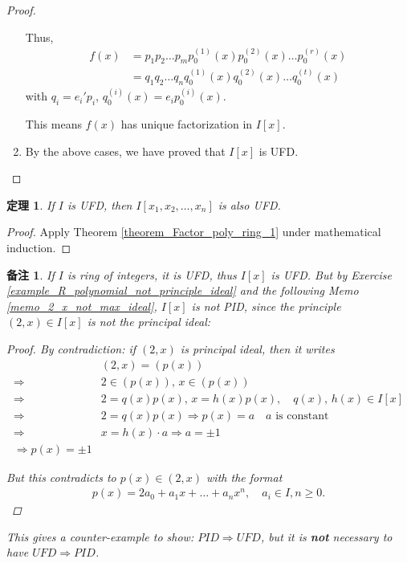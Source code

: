 \documentclass[utf8]{ctexbook}
\newtheorem{theorem}{定理}[section]
\newtheorem{memo}{备注}[section]
\begin{document}
\begin{proof}
\begin{enumerate}
{\begin{itemize}
{Thus,
\begin{align*}
f(x) &= p_1 p_2 \ldots p_m p_0 ^{(1)} (x) p_0 ^{(2)} (x) \ldots p_0 ^{(r)} (x)  \\
&= q_1 q_2 \ldots q_n q_0 ^{(1)} (x) q_0 ^{(2)} (x) \ldots q_0 ^{(t)} (x) 
\end{align*}
with $q_i = e_i ' p_i $, $q_0 ^{(i)} (x) = e_i p_0 ^{(i)} (x)$.

This means $f(x)$ has unique factorization in $I[x]$. 
}
\end{itemize}
}
\item{By the above cases, we have proved that $I[x]$ is UFD.}
\end{enumerate}
\end{proof}


\begin{theorem}
\label{theorem_Factor_poly_ring_2}
If $I$ is UFD, then $I[x_1, x_2, \ldots, x_n]$ is also UFD.
\end{theorem}

\begin{proof}
Apply Theorem \ref{theorem_Factor_poly_ring_1} under mathematical induction.
\end{proof}


\begin{memo}
If $I$ is ring of integers, it is UFD, thus $I[x]$ is UFD. But by Exercise \ref{example_R_polynomial_not_principle_ideal} and the following Memo \ref{memo_2_x_not_max_ideal}, $I[x]$ is not PID, since the principle $(2, x) \in I[x]$ is not the principal ideal: 

\begin{proof}

By contradiction: if $(2,x)$ is principal ideal, then it writes
\begin{align*}
& (2,x) = (p(x)) \\
\Longrightarrow & 2 \in (p(x)), \, x \in (p(x)) \\
\Longrightarrow & 2 = q(x) p(x), \, x = h(x) p(x), \quad q(x), \, h(x) \in I[x] \\
\Longrightarrow & 2 = q(x) p(x) \Longrightarrow p(x) = a \quad a \mbox{ is constant} \\
\Longrightarrow & x = h(x) \cdot a \Longrightarrow a = \pm 1 \\
\Longrightarrow p(x) = \pm 1 
\end{align*}

But this contradicts to $p(x) \in (2, x)$ with the format
\begin{align*}
p(x) = 2 a_0 + a_1 x + \ldots + a_n x^n, \quad a_i \in I, n \geq 0 .
\end{align*}

\end{proof}


This gives a counter-example to show: $PID \Longrightarrow UFD$, but it is \textbf{not} necessary to have $UFD \Longrightarrow PID$.
\end{memo}
\end{document}

